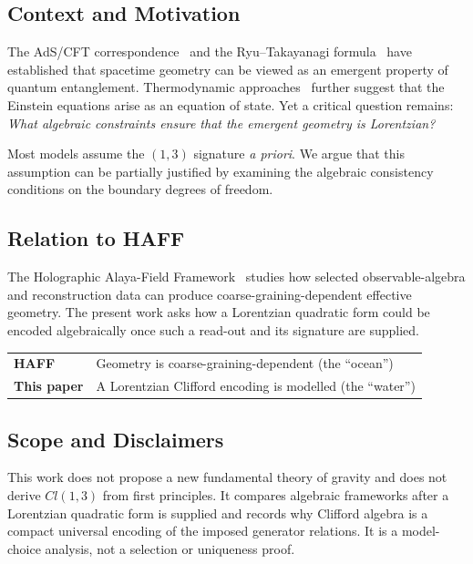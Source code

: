 \documentclass[12pt]{article}
\begin{document}
\subsection{Context and Motivation}

The AdS/CFT correspondence~\cite{Maldacena1999} and the Ryu--Takayanagi formula~\cite{RyuTakayanagi2006} have established that spacetime geometry can be viewed as an emergent property of quantum entanglement.
Thermodynamic approaches~\cite{Jacobson1995,Verlinde2011} further suggest that the Einstein equations arise as an equation of state.
Yet a critical question remains: \textit{What algebraic constraints ensure that the emergent geometry is Lorentzian?}

Most models assume the $(1,3)$ signature \textit{a priori}.
We argue that this assumption can be partially justified by examining the algebraic consistency conditions on the boundary degrees of freedom.

\subsection{Relation to HAFF}

The Holographic Alaya-Field Framework~\cite{Liu2026PaperA,Liu2026PaperB} studies how selected observable-algebra and reconstruction data can produce coarse-graining-dependent effective geometry.
The present work asks how a Lorentzian quadratic form could be encoded algebraically once such a read-out and its signature are supplied.

\begin{center}
\begin{tabular}{ll}
\textbf{HAFF} & Geometry is coarse-graining-dependent (the ``ocean'') \\
\textbf{This paper} & A Lorentzian Clifford encoding is modelled (the ``water'')
\end{tabular}
\end{center}

\subsection{Scope and Disclaimers}

This work does not propose a new fundamental theory of gravity and does not derive $Cl(1,3)$ from first principles.  It compares algebraic frameworks after a Lorentzian quadratic form is supplied and records why Clifford algebra is a compact universal encoding of the imposed generator relations.  It is a model-choice analysis, not a selection or uniqueness proof.
\end{document}
